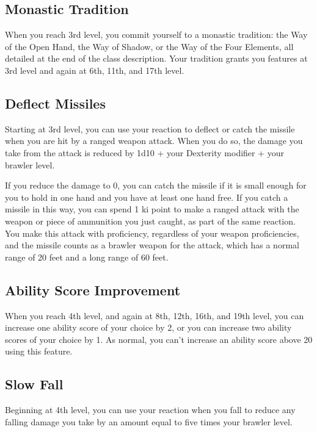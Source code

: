 \subsection{Monastic Tradition}

When you reach 3rd level, you commit yourself to a monastic tradition: the Way of the Open Hand, the Way of Shadow, or the Way of the Four Elements, all detailed at the end of the class description. Your tradition grants you features at 3rd level and again at 6th, 11th, and 17th level.

\subsection{Deflect Missiles}

Starting at 3rd level, you can use your reaction to deflect or catch the missile when you are hit by a ranged weapon attack. When you do so, the damage you take from the attack is reduced by 1d10 + your Dexterity modifier + your brawler level.

If you reduce the damage to 0, you can catch the missile if it is small enough for you to hold in one hand and you have at least one hand free. If you catch a missile in this way, you can spend 1 ki point to make a ranged attack with the weapon or piece of ammunition you just caught, as part of the same reaction. You make this attack with proficiency, regardless of your weapon proficiencies, and the missile counts as a brawler weapon for the attack, which has a normal range of 20 feet and a long range of 60 feet.

\subsection{Ability Score Improvement}

When you reach 4th level, and again at 8th, 12th, 16th, and 19th level, you can increase one ability score of your choice by 2, or you can increase two ability scores of your choice by 1. As normal, you can’t increase an ability score above 20 using this feature.

\subsection{Slow Fall}

Beginning at 4th level, you can use your reaction when you fall to reduce any falling damage you take by an amount equal to five times your brawler level.

